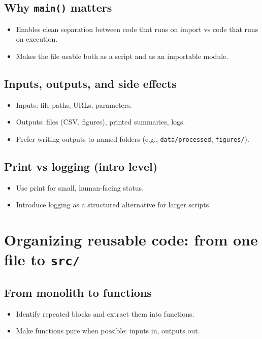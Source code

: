 \subsection{Why \texttt{main()} matters}
\begin{itemize}
\item Enables clean separation between code that runs on import vs code that runs on execution.
\item Makes the file usable both as a script and as an importable module.
\end{itemize}

\subsection{Inputs, outputs, and side effects}
\begin{itemize}
\item Inputs: file paths, URLs, parameters.
\item Outputs: files (CSV, figures), printed summaries, logs.
\item Prefer writing outputs to named folders (e.g., \texttt{data/processed}, \texttt{figures/}).
\end{itemize}

\subsection{Print vs logging (intro level)}
\begin{itemize}
\item Use print for small, human-facing status.
\item Introduce logging as a structured alternative for larger scripts.
\end{itemize}

\section{Organizing reusable code: from one file to \texttt{src/}}
\subsection{From monolith to functions}
\begin{itemize}
\item Identify repeated blocks and extract them into functions.
\item Make functions pure when possible: inputs in, outputs out.
\end{itemize}

